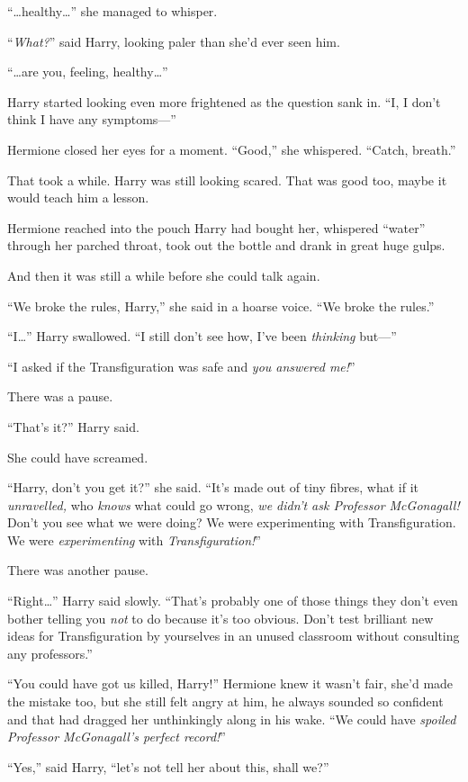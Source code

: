 “…healthy…” she managed to whisper.

“\emph{What?}” said Harry, looking paler than she’d ever seen him.

“…are you, feeling, healthy…”

Harry started looking even more frightened as the question sank in. “I, I don’t think I have any symptoms—”

Hermione closed her eyes for a moment. “Good,” she whispered. “Catch, breath.”

That took a while. Harry was still looking scared. That was good too, maybe it would teach him a lesson.

Hermione reached into the pouch Harry had bought her, whispered “water” through her parched throat, took out the bottle and drank in great huge gulps.

And then it was still a while before she could talk again.

“We broke the rules, Harry,” she said in a hoarse voice. “We broke the rules.”

“I…” Harry swallowed. “I still don’t see how, I’ve been \emph{thinking} but—”

“I asked if the Transfiguration was safe and \emph{you answered me!}”

There was a pause.

“That’s it?” Harry said.

She could have screamed.

“Harry, don’t you get it?” she said. “It’s made out of tiny fibres, what if it \emph{unravelled,} who \emph{knows} what could go wrong, \emph{we didn’t ask Professor McGonagall!} Don’t you see what we were doing? We were experimenting with Transfiguration. We were \emph{experimenting} with \emph{Transfiguration!}”

There was another pause.

“Right…” Harry said slowly. “That’s probably one of those things they don’t even bother telling you \emph{not} to do because it’s too obvious. Don’t test brilliant new ideas for Transfiguration by yourselves in an unused classroom without consulting any professors.”

“You could have got us killed, Harry!” Hermione knew it wasn’t fair, she’d made the mistake too, but she still felt angry at him, he always sounded so confident and that had dragged her unthinkingly along in his wake. “We could have \emph{spoiled Professor McGonagall’s perfect record!}”

“Yes,” said Harry, “let’s not tell her about this, shall we?”

